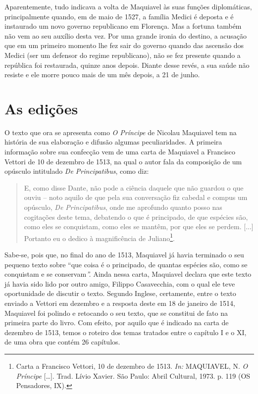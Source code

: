 Aparentemente, tudo indicava a volta de Maquiavel às suas funções
diplomáticas, principalmente quando, em de maio de 1527, a família
Medici é deposta e é instaurado um novo governo republicano em Florença.
Mas a fortuna também não vem ao seu auxílio desta vez. Por uma grande
ironia do destino, a acusação que em um primeiro momento lhe fez sair do
governo quando das ascensão dos Medici (ser um defensor do regime
republicano), não se fez presente quando a república foi restaurada,
quinze anos depois. Diante desse revés, a sua saúde não resiste e ele
morre pouco mais de um mês depois, a 21 de junho.

\section{As edições}

O texto que ora se apresenta como \emph{O Príncipe} de Nicolau Maquiavel
tem na história de sua elaboração e difusão algumas peculiaridades. A
primeira informação sobre sua confecção vem de uma carta de Maquiavel a
Francisco Vettori de 10 de dezembro de 1513, na qual o autor fala da
composição de um opúsculo intitulado \emph{De Principatibus}, como diz:

\begin{quote}
E, como disse Dante, não pode a ciência daquele que não guardou o que
ouviu -- noto aquilo de que pela sua conversação fiz cabedal e compus um
opúsculo, \emph{De Principatibus}, onde me aprofundo quanto posso nas
cogitações deste tema, debatendo o que é principado, de que espécies
são, como eles se conquistam, como eles se mantêm, por que eles se
perdem. {[}...{]} Portanto eu o dedico à magnificência de
Juliano\footnote{Carta a Francisco Vettori, 10 de dezembro de 1513.
  \emph{In:} MAQUIAVEL, N. \emph{O Príncipe} {[}\ldots{}{]}. Trad. Lívio
  Xavier. São Paulo: Abril Cultural, 1973. p. 119 (OS Pensadores, IX).}.
\end{quote}

Sabe-se, pois que, no final do ano de 1513, Maquiavel já havia terminado
o seu pequeno texto sobre ``que coisa é o principado, de quantas
espécies são, como se conquistam e se conservam\emph{''.} Ainda nessa
carta, Maquiavel declara que este texto já havia sido lido por outro
amigo, Filippo Casavecchia, com o qual ele teve oportunidade de discutir
o texto. Segundo Inglese, certamente, entre o texto enviado a Vettori em
dezembro e a resposta deste em 18 de janeiro de 1514, Maquiavel foi
polindo e retocando o seu texto, que se constitui de fato na primeira
parte do livro. Com efeito, por aquilo que é indicado na carta de
dezembro de 1513, temos o roteiro dos temas tratados entre o capítulo I
e o XI, de uma obra que contém 26 capítulos.

